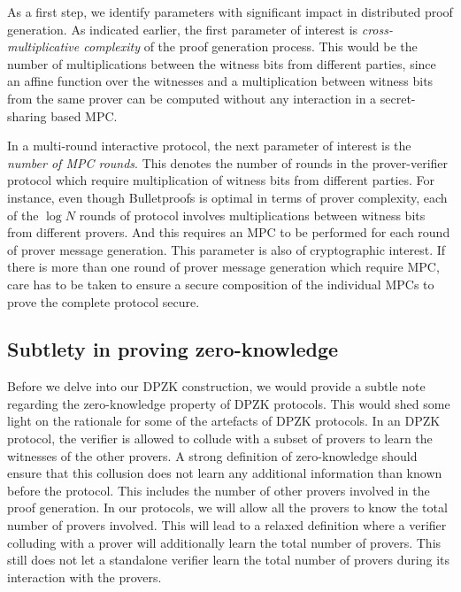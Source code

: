 As a first step, we identify parameters with significant impact in distributed proof generation. 
As indicated earlier, the first parameter of interest is \textit{cross-multiplicative complexity} of the proof generation process. 
This would be the number of multiplications between the witness bits from different parties, since an affine function over the witnesses and a multiplication between witness bits from the same prover can be computed without any interaction in a secret-sharing based MPC.

In a multi-round interactive protocol, the next parameter of interest is the \textit{number of MPC rounds}. This denotes the number of rounds in the prover-verifier protocol which require multiplication of witness bits from different parties. For instance, even though Bulletproofs \cite{bulletproofs} is optimal in terms of prover complexity, each of the $\log N$ rounds of protocol involves multiplications between witness bits from different provers. And this requires an MPC to be performed for each round of prover message generation.
This parameter is also of cryptographic interest. If there is more than one round of prover message generation which require MPC, care has to be taken to ensure a secure composition of the individual MPCs to prove the complete protocol secure.

\subsection{Subtlety in proving zero-knowledge}
Before we delve into our DPZK construction, we would provide a subtle note regarding the zero-knowledge property of DPZK protocols. This would shed some light on the rationale for some of the artefacts of DPZK protocols. In an DPZK protocol, the verifier is allowed to collude with a subset of provers to learn the witnesses of the other provers. A strong definition of zero-knowledge should ensure that this collusion does not learn any additional information than known before the protocol. This includes the number of other provers involved in the proof generation.  In our protocols, we will allow all the provers to know the total number of provers involved. This will lead to a relaxed definition where a verifier colluding with a prover will additionally learn the total number of provers. This still does not let a standalone verifier learn the total number of provers during its interaction with the provers.

